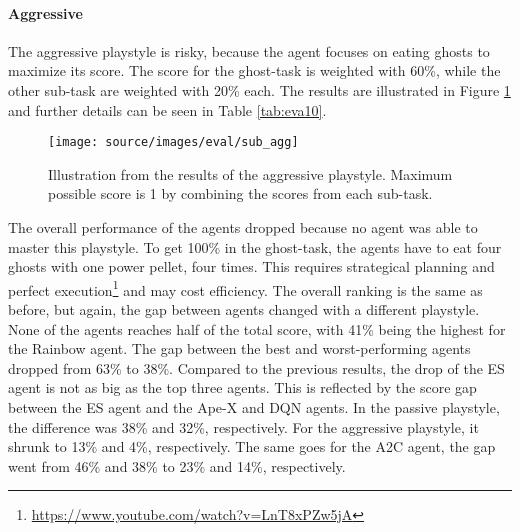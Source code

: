 \paragraph{Aggressive}
The aggressive playstyle is risky, because the agent focuses on eating ghosts to maximize its score. The score for the ghost-task is weighted with 60\%, while the other sub-task are weighted with 20\% each. The results are illustrated in Figure \ref{fig:sub_agg} and further details can be seen in Table \ref{tab:eva10}.
\begin{figure}[H]%
\centering
\texttt{[image: source/images/eval/sub\_agg]}%
\caption[Illustration from the results of the aggressive playstyle]{Illustration from the results of the aggressive playstyle. Maximum possible score is 1 by combining the scores from each sub-task.}%
\label{fig:sub_agg}%
\end{figure}
The overall performance of the agents dropped because no agent was able to master this playstyle. To get 100\% in the ghost-task, the agents have to eat four ghosts with one power pellet, four times. This requires strategical planning and perfect execution\footnote{\url{https://www.youtube.com/watch?v=LnT8xPZw5jA}} and may cost efficiency. The overall ranking is the same as before, but again, the gap between agents changed with a different playstyle. None of the agents reaches half of the total score, with 41\% being the highest for the Rainbow agent. The gap between the best and worst-performing agents dropped from 63\% to 38\%. Compared to the previous results, the drop of the ES agent is not as big as the top three agents. This is reflected by the score gap between the ES agent and the Ape-X and DQN agents. In the passive playstyle, the difference was 38\% and 32\%, respectively. For the aggressive playstyle, it shrunk to 13\% and 4\%, respectively. The same goes for the A2C agent, the gap went from 46\% and 38\% to 23\% and 14\%, respectively.

